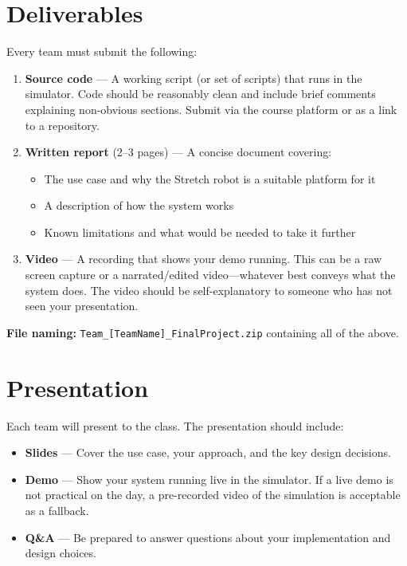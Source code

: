 \documentclass[11pt,a4paper]{article}
\begin{document}
\section*{Deliverables}

Every team must submit the following:

\begin{enumerate}
    \item \textbf{Source code} --- A working script (or set of scripts) that runs in the simulator. Code should be reasonably clean and include brief comments explaining non-obvious sections. Submit via the course platform or as a link to a repository.

    \item \textbf{Written report} (2--3 pages) --- A concise document covering:
    \begin{itemize}
        \item The use case and why the Stretch robot is a suitable platform for it
        \item A description of how the system works
        \item Known limitations and what would be needed to take it further
    \end{itemize}

    \item \textbf{Video} --- A recording that shows your demo running. This can be a raw screen capture or a narrated/edited video---whatever best conveys what the system does. The video should be self-explanatory to someone who has not seen your presentation.
\end{enumerate}

\textbf{File naming:} \texttt{Team\_[TeamName]\_FinalProject.zip} containing all of the above.

\section*{Presentation}

Each team will present to the class. The presentation should include:

\begin{itemize}
    \item \textbf{Slides} --- Cover the use case, your approach, and the key design decisions.
    \item \textbf{Demo} --- Show your system running live in the simulator. If a live demo is not practical on the day, a pre-recorded video of the simulation is acceptable as a fallback.
    \item \textbf{Q\&A} --- Be prepared to answer questions about your implementation and design choices.
\end{itemize}
\end{document}
